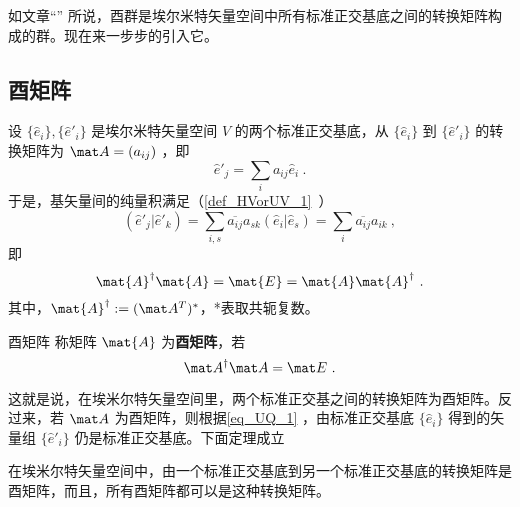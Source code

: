 
如文章“” 所说，酉群是埃尔米特矢量空间中所有标准正交基底之间的转换矩阵构成的群。现在来一步步的引入它。
\subsection{酉矩阵}
设 $\{ \hat e_i\},\{  \hat e'_i\}$ 是埃尔米特矢量空间 $V$ 的两个标准正交基底，从 $\{ \hat e_i\}$ 到 $\{\hat e'_i\}$ 的转换矩阵为 $\mat A=(a_{ij})$ ，即
\begin{equation}\label{eq_UQ_1}
   \hat e'_j=\sum_{i}a_{ij} \hat e_i~.
\end{equation}
于是，基矢量间的纯量积满足（\autoref{def_HVorUV_1}~）
\begin{equation}
( \hat e'_j| \hat e'_k)=\sum_{i,s}\overline{a_{ij}}a_{sk}(\hat e_i|\hat e_s)=\sum_{i}\overline{a_{ij}}a_{ik}~,
\end{equation}
即
\begin{equation}\label{eq_UQ_2}
\mat{A}^\dagger \mat{A}=\mat{E}=\mat{A} \mat{A}^\dagger~.
\end{equation}
其中，$\mat{A}^\dagger:=(\mat A^T)^*$，*表取共轭复数。
\begin{definition}{酉矩阵}
称矩阵 $\mat{A}$ 为\textbf{酉矩阵}，若
\begin{equation}
\mat A^\dagger \mat A=\mat E~.
\end{equation}
\end{definition}
这就是说，在埃米尔特矢量空间里，两个标准正交基之间的转换矩阵为酉矩阵。反过来，若 $\mat A$ 为酉矩阵，则根据\autoref{eq_UQ_1} ，由标准正交基底 $\{\hat e_i\}$ 得到的矢量组 $\{\hat e'_i\}$ 仍是标准正交基底。下面定理成立
\begin{theorem}{}
在埃米尔特矢量空间中，由一个标准正交基底到另一个标准正交基底的转换矩阵是酉矩阵，而且，所有酉矩阵都可以是这种转换矩阵。
\end{theorem}

